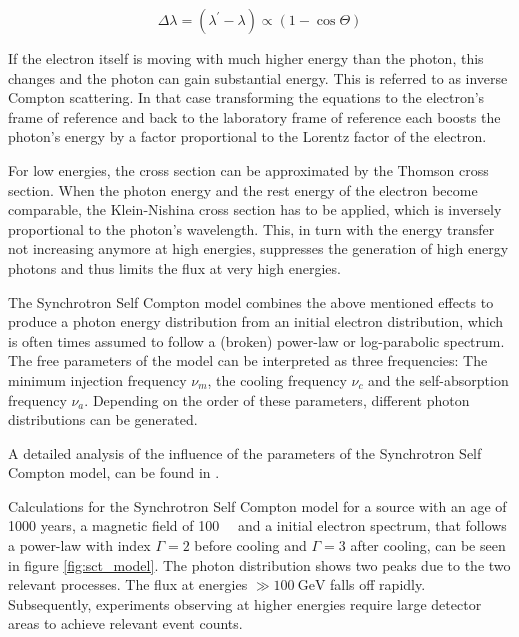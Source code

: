 \begin{equation}
	\Delta \lambda = (\lambda^{\prime} - \lambda)  \propto \left(1-\cos{\Theta} \right)
	\label{eq:compton}
\end{equation}

If the electron itself is moving with much higher energy
than the photon, this changes and the photon can gain substantial energy.
This is referred to as inverse Compton scattering.
In that case transforming the equations to the 
electron's frame of reference and back to the laboratory frame of reference each
boosts the photon's energy by a factor proportional to 
the Lorentz factor of the electron.

For low energies, the cross section can be approximated by 
the Thomson cross section. 
When the photon energy and the rest energy of the electron
become comparable, the Klein-Nishina cross section has to be applied,
which is inversely proportional to the photon's
wavelength.
This, in turn with the energy transfer not increasing anymore at high energies,
suppresses the generation of high energy photons \cite{Nakar_2009} and
thus limits the flux at very high energies.

The Synchrotron Self Compton model combines the above mentioned
effects to produce a photon energy distribution from an initial
electron distribution, which is often times assumed to
follow a (broken) power-law or log-parabolic spectrum.
The free parameters of the model can be interpreted as 
three frequencies: The minimum injection frequency $\nu_m$,
the cooling frequency $\nu_c$ and the self-absorption frequency $\nu_a$.
Depending on the order of these parameters, different
photon distributions can be generated.

A detailed analysis of the influence of the parameters of
the Synchrotron Self Compton model, can be found in 
\cite{10.1093/mnras/stt1461}.

Calculations for the Synchrotron Self Compton model for a source
with an age of 1000 years, a magnetic field of
\SI{100}{\micro\gauss} and a initial electron spectrum, that
follows a power-law with index $\Gamma=2$ before cooling and 
$\Gamma=3$ after cooling, can be seen in figure \ref{fig:sct_model}.
The photon distribution shows two peaks due to the
two relevant processes.
The flux at energies $\gg \SI{100}{\giga\electronvolt}$
falls off rapidly. Subsequently, experiments
observing at higher energies require large detector areas
to achieve relevant event counts.


